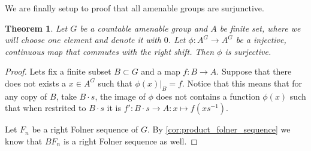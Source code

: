 \documentclass[titlepage, a4paper]{article}
\newtheorem{theorem}{Theorem}
\theoremstyle{remark}
\begin{document}
We are finally setup to proof that all amenable groups are surjunctive.
\begin{theorem}
	Let $G$ be a countable amenable group and  $A$ be finite set, where we will choose one element and denote it with $0$. Let  $\phi: A^{G} \to A^{G}$ be a injective, continuous map that commutes with the right shift. Then $\phi$ is surjective.
\end{theorem}

\begin{proof}
	Lets fix a finite subset $B \subset G$ and a map $f:B\to A$. 
	Suppose that there does not exists a  $x \in A^{G}$ such that $\phi(x)|_B = f$.
	Notice that this means that for any copy of $B$, take  $B\cdot s$, the image of $\phi$ does not contains a function  $\phi(x)$ such that when restrited to  $B\cdot s$ it is $f': B\cdot s \to A: x \mapsto f\left( x s^{-1} \right) $.

	Let $F_n$ be a right Folner sequence of $G$. By \cref{cor:product_folner_sequence} we know that $BF_n$ is a right Folner sequence as well. 


\end{proof}
\end{document}
